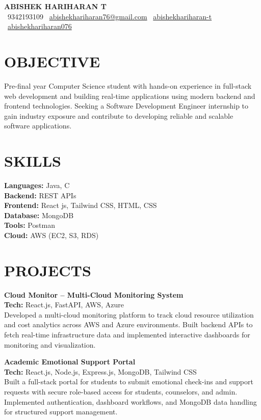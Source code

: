 \documentclass[letterpaper,11pt]{article}
\begin{document}
\begin{center}
{\Huge \textbf{ABISHEK HARIHARAN T}}\\
\vspace{4pt}
\faPhone*~9342193109 \quad
\faEnvelope~\href{mailto:abishekhariharan76@gmail.com}{abishekhariharan76@gmail.com} \quad
\faLinkedin~\href{https://linkedin.com/in/abishekhariharan-t}{abishekhariharan-t} \quad
\faGithub~\href{https://github.com/abishekhariharan076}{abishekhariharan076}
\end{center}

\section{OBJECTIVE}
\justifying
Pre-final year Computer Science student with hands-on experience in full-stack web development and building real-time applications using modern backend and frontend technologies. Seeking a Software Development Engineer internship to gain industry exposure and contribute to developing reliable and scalable software applications.

\section{SKILLS}
\textbf{Languages:} Java, C\\
\textbf{Backend:} REST APIs \\
\textbf{Frontend:} React js, Tailwind CSS, HTML, CSS \\
\textbf{Database:} MongoDB \\
\textbf{Tools:} Postman \\
\textbf{Cloud:} AWS (EC2, S3, RDS)

\section{PROJECTS}
\noindent\textbf{Cloud Monitor – Multi-Cloud Monitoring System}\\
\textbf{Tech:} React.js, FastAPI, AWS, Azure \\
Developed a multi-cloud monitoring platform to track cloud resource utilization and cost analytics across AWS and Azure environments. Built backend APIs to fetch real-time infrastructure data and implemented interactive dashboards for monitoring and visualization.

\vspace{6pt}

\noindent\textbf{Academic Emotional Support Portal}\\
\textbf{Tech:} React.js, Node.js, Express.js, MongoDB, Tailwind CSS \\
Built a full-stack portal for students to submit emotional check-ins and support requests with secure role-based access for students, counselors, and admin. Implemented authentication, dashboard workflows, and MongoDB data handling for structured support management.
\end{document}
